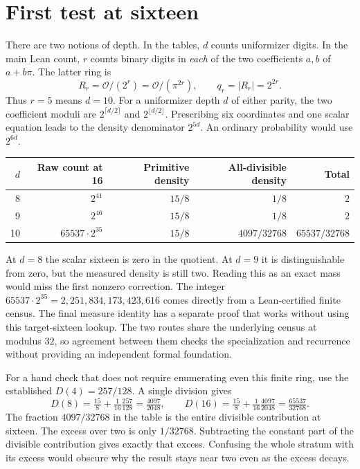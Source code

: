 \documentclass[12pt,letterpaper]{article}
\begin{document}
\section{First test at sixteen}
There are two notions of depth. In the tables, $d$ counts uniformizer digits. In the main Lean count, $r$ counts binary digits in \emph{each} of the two coefficients $a,b$ of $a+b\pi$. The latter ring is
\[
 R_r=\mathcal O/(2^r)=\mathcal O/(\pi^{2r}), \qquad q_r=|R_r|=2^{2r}.
\]
Thus $r=5$ means $d=10$. For a uniformizer depth $d$ of either parity, the two coefficient moduli are $2^{\lceil d/2\rceil}$ and $2^{\lfloor d/2\rfloor}$. Prescribing six coordinates and one scalar equation leads to the density denominator $2^{5d}$. An ordinary probability would use $2^{6d}$.

\begin{center}\small\begin{tabular}{rrrrr}\toprule
$d$ & Raw count at 16 & Primitive density & All-divisible density & Total\\\midrule
8 & $2^{41}$ & $15/8$ & $1/8$ & $2$\\
9 & $2^{46}$ & $15/8$ & $1/8$ & $2$\\
10 & $65537\cdot2^{35}$ & $15/8$ & $4097/32768$ & $65537/32768$\\\bottomrule
\end{tabular}\end{center}
At $d=8$ the scalar sixteen is zero in the quotient. At $d=9$ it is distinguishable from zero, but the measured density is still two. Reading this as an exact mass would miss the first nonzero correction. The integer $65537\cdot2^{35}=2{,}251{,}834{,}173{,}423{,}616$ comes directly from a Lean-certified finite census. The final measure identity has a separate proof that works without using this target-sixteen lookup. The two routes share the underlying census at modulus $32$, so agreement between them checks the specialization and recurrence without providing an independent formal foundation.

For a hand check that does not require enumerating even this finite ring, use the established $D(4)=257/128$. A single division gives
\[
 D(8)=\tfrac{15}{8}+\tfrac1{16}\tfrac{257}{128}
      =\tfrac{4097}{2048},\qquad
 D(16)=\tfrac{15}{8}+\tfrac1{16}\tfrac{4097}{2048}
      =\tfrac{65537}{32768}.
\]
The fraction $4097/32768$ in the table is the entire divisible contribution at sixteen. The excess over two is only $1/32768$. Subtracting the constant part of the divisible contribution gives exactly that excess. Confusing the whole stratum with its excess would obscure why the result stays near two even as the excess decays.
\end{document}
